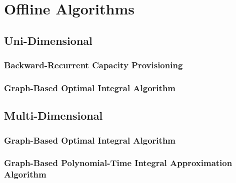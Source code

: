
\chapter{Offline Algorithms}\label{chapter:offline_algorithms}

\section{Uni-Dimensional}

\subsection{Backward-Recurrent Capacity Provisioning}

\subsection{Graph-Based Optimal Integral Algorithm}

\section{Multi-Dimensional}

\subsection{Graph-Based Optimal Integral Algorithm}

\subsection{Graph-Based Polynomial-Time Integral Approximation Algorithm}
